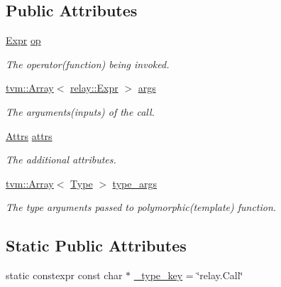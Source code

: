 \subsection*{Public Attributes}
\begin{DoxyCompactItemize}
\item 
\hyperlink{namespacetvm_1_1relay_a5b84e3790f89bb3fad5c7911eeb99531}{Expr} \hyperlink{classtvm_1_1relay_1_1CallNode_ade66944f5a2f064e4eb07ad9f9438306}{op}
\begin{DoxyCompactList}\small\item\em The operator(function) being invoked. \end{DoxyCompactList}\item 
\hyperlink{classtvm_1_1Array}{tvm\+::\+Array}$<$ \hyperlink{namespacetvm_1_1relay_a5b84e3790f89bb3fad5c7911eeb99531}{relay\+::\+Expr} $>$ \hyperlink{classtvm_1_1relay_1_1CallNode_a7b2ba771babac0a99e2909227d35c092}{args}
\begin{DoxyCompactList}\small\item\em The arguments(inputs) of the call. \end{DoxyCompactList}\item 
\hyperlink{classtvm_1_1Attrs}{Attrs} \hyperlink{classtvm_1_1relay_1_1CallNode_ac9d1656e2a9fda49049186c3aa3eb208}{attrs}
\begin{DoxyCompactList}\small\item\em The additional attributes. \end{DoxyCompactList}\item 
\hyperlink{classtvm_1_1Array}{tvm\+::\+Array}$<$ \hyperlink{namespacetvm_1_1relay_a661d95f170bca230773914caeef3fe52}{Type} $>$ \hyperlink{classtvm_1_1relay_1_1CallNode_ad23d97a6ae1cc1bea903d4c714f811d6}{type\+\_\+args}
\begin{DoxyCompactList}\small\item\em The type arguments passed to polymorphic(template) function. \end{DoxyCompactList}\end{DoxyCompactItemize}
\subsection*{Static Public Attributes}
\begin{DoxyCompactItemize}
\item 
static constexpr const char $\ast$ \hyperlink{classtvm_1_1relay_1_1CallNode_a978aab84f7bf94e9f860014dafb95055}{\+\_\+type\+\_\+key} = \char`\"{}relay.\+Call\char`\"{}
\end{DoxyCompactItemize}


